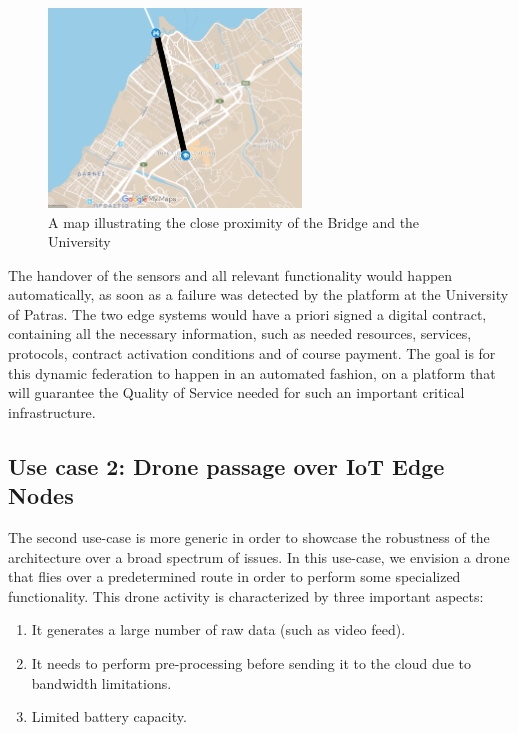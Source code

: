 \begin{figure}[ht]
    \centering
    \includegraphics[width=0.6\textwidth]{images/usecase1map.png}
    \caption{A map illustrating the close proximity of the Bridge and the University}
    \label{fig:rio-map}
\end{figure}

The handover of the sensors and all relevant functionality would happen automatically, as soon as a failure was detected by the platform at the University of Patras. The two edge systems would have a priori signed a digital contract, containing all the necessary information, such as needed resources, services, protocols, contract activation conditions and of course payment. The goal is for this dynamic federation to happen in an automated fashion, on a platform that will guarantee the Quality of Service needed for such an important critical infrastructure.

\subsection{Use case 2: Drone passage over IoT Edge Nodes}

The second use-case is more generic in order to showcase the robustness of the architecture over a broad spectrum of issues. In this use-case, we envision a drone that flies over a predetermined route in order to perform some specialized functionality. This drone activity is characterized by three important aspects: 

\begin{enumerate}
    \item  It generates a large number of raw data (such as video feed).
    \item It needs to perform pre-processing before sending it to the cloud due to bandwidth limitations.
    \item Limited battery capacity.
\end{enumerate}

